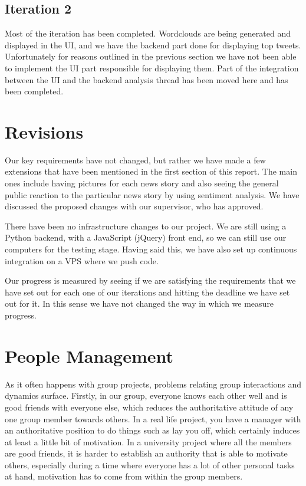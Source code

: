 \documentclass[a4paper,12pt]{article}
\begin{document}
	\subsection{Iteration 2}
	Most of the iteration has been completed. Wordclouds are being generated and displayed in the UI, and we have the backend part done for displaying top tweets. Unfortunately for reasons outlined in the previous section we have not been able to implement the UI part responsible for displaying them. Part of the integration between the UI and the backend analysis thread has been moved here and has been completed.
	
	\section{Revisions}
	
	Our key requirements have not changed, but rather we have made a few extensions that have been mentioned in the first section of this report. The main ones include having pictures for each news story and also seeing the general public reaction to the particular news story by using sentiment analysis. We have discussed the proposed changes with our supervisor, who has approved.
  
  There have been no infrastructure changes to our project. We are still using a Python backend, with a JavaScript (jQuery) front end, so we can still use our computers for the testing stage. Having said this, we have also set up continuous integration on a VPS where we push code.
  
  Our progress is measured by seeing if we are satisfying the requirements that we have set out for each one of our iterations and hitting the deadline we have set out for it. In this sense we have not changed the way in which we measure progress.
  
	
	
	
	\section{People Management}
	
	As it often happens with group projects, problems relating group interactions and dynamics surface. Firstly, in our group, everyone knows each other well and is good friends with everyone else, which reduces the authoritative attitude of any one group member towards others. In a real life project, you have a manager with an authoritative position to do things such as lay you off, which certainly induces at least a little bit of motivation. In a university project where all the members are good friends, it is harder to establish an authority that is able to motivate others, especially during a time where everyone has a lot of other personal tasks at hand, motivation has to come from within the group members.
	
\end{document}
